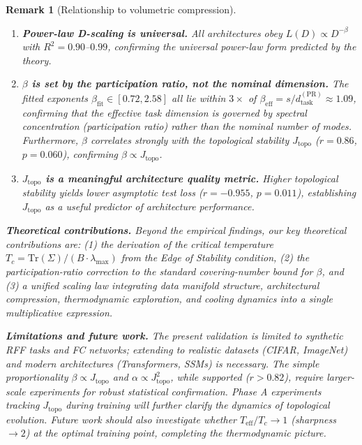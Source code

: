 \documentclass[11pt, a4paper]{article}
\theoremstyle{plain}
\newtheorem*{remark}{Remark}
\begin{document}
\begin{remark}[Relationship to volumetric compression]
\begin{enumerate}
    \item[\textbf{C1}] \textbf{Power-law D-scaling is universal.} All architectures obey $L(D) \propto D^{-\beta}$ with $R^2 = 0.90$--$0.99$, confirming the universal power-law form predicted by the theory.
    \item[\textbf{C2}] \textbf{$\beta$ is set by the participation ratio, not the nominal dimension.} The fitted exponents $\beta_{\mathrm{fit}} \in [0.72, 2.58]$ all lie within $3\times$ of $\beta_{\mathrm{eff}} = s/d_{\mathrm{task}}^{\mathrm{(PR)}} \approx 1.09$, confirming that the effective task dimension is governed by spectral concentration (participation ratio) rather than the nominal number of modes. Furthermore, $\beta$ correlates strongly with the topological stability $J_{\mathrm{topo}}$ ($r = 0.86$, $p = 0.060$), confirming $\beta \propto J_{\mathrm{topo}}$.
    \item[\textbf{C3}] \textbf{$J_{\mathrm{topo}}$ is a meaningful architecture quality metric.} Higher topological stability yields lower asymptotic test loss ($r = -0.955$, $p = 0.011$), establishing $J_{\mathrm{topo}}$ as a useful predictor of architecture performance.
\end{enumerate}

\bigskip\noindent\textbf{Theoretical contributions.} Beyond the empirical findings, our key theoretical contributions are: (1) the derivation of the critical temperature $T_c = \mathrm{Tr}(\Sigma)/(B\cdot\lambda_{\max})$ from the Edge of Stability condition, (2) the participation-ratio correction to the standard covering-number bound for $\beta$, and (3) a unified scaling law integrating data manifold structure, architectural compression, thermodynamic exploration, and cooling dynamics into a single multiplicative expression.

\bigskip\noindent\textbf{Limitations and future work.} The present validation is limited to synthetic RFF tasks and FC networks; extending to realistic datasets (CIFAR, ImageNet) and modern architectures (Transformers, SSMs) is necessary. The simple proportionality $\beta \propto J_{\mathrm{topo}}$ and $\alpha \propto J_{\mathrm{topo}}^2$, while supported ($r > 0.82$), require larger-scale experiments for robust statistical confirmation. Phase A experiments tracking $J_{\mathrm{topo}}$ during training will further clarify the dynamics of topological evolution. Future work should also investigate whether $T_{\mathrm{eff}}/T_c \to 1$ (sharpness $\to 2$) at the optimal training point, completing the thermodynamic picture.


\end{remark}
\end{document}
